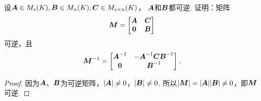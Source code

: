 \begin{example}\label{example:可逆矩阵.分块上三角矩阵的逆}
设\(\boldsymbol{A} \in M_s(K),
\boldsymbol{B} \in M_n(K),
\boldsymbol{C} \in M_{s \times n}(K)\)，
\(\boldsymbol{A}\)和\(\boldsymbol{B}\)都可逆.
证明：矩阵\begin{equation*}
	\boldsymbol{M} = \begin{bmatrix}
		\boldsymbol{A} & \boldsymbol{C} \\
		\boldsymbol0 & \boldsymbol{B}
	\end{bmatrix}
\end{equation*}可逆，且\begin{equation*}
	\boldsymbol{M}^{-1} = \begin{bmatrix}
		\boldsymbol{A}^{-1} & -\boldsymbol{A}^{-1} \boldsymbol{C} \boldsymbol{B}^{-1} \\
		\boldsymbol0 & \boldsymbol{B}^{-1}
	\end{bmatrix}.
\end{equation*}
\begin{proof}
因为\(\boldsymbol{A}\)、\(\boldsymbol{B}\)为可逆矩阵，\(\abs{\boldsymbol{A}} \neq 0\)，\(\abs{\boldsymbol{B}} \neq 0\).
所以\(\abs{\boldsymbol{M}}=\abs{\boldsymbol{A}}\abs{\boldsymbol{B}} \neq 0\)，即\(\boldsymbol{M}\)可逆.


\end{proof}
\end{example}
